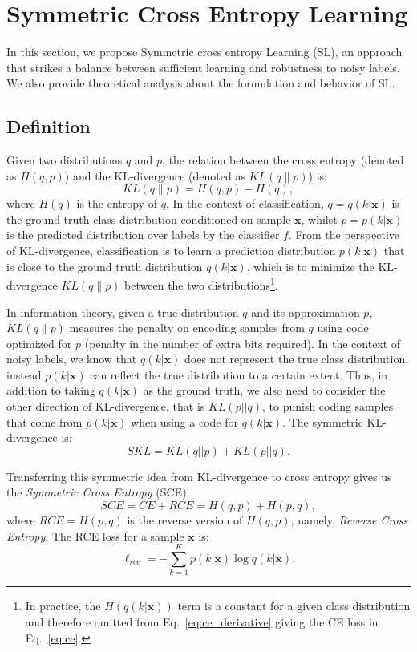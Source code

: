 \documentclass[10pt,twocolumn,letterpaper]{article}
\def \xx {\mathbf{x}}
\begin{document}
\section{Symmetric Cross Entropy Learning}\label{sec:sce}
In this section, we propose Symmetric cross entropy Learning (SL), an approach that strikes a balance between sufficient learning and robustness to noisy labels.  We also provide theoretical analysis about the formulation and behavior of SL.

\subsection{Definition}
Given two distributions $q$ and $p$, the relation between the cross entropy (denoted as $H(q, p)$) and the KL-divergence (denoted as $KL(q\| p)$) is:
\begin{equation}
\label{eq:ce_derivative}
KL(q \| p) = H(q, p) - H(q),
\end{equation}
where $H(q)$ is the entropy of $q$. In the context of classification, $q=q(k|\xx)$ is the ground truth class distribution conditioned on sample $\xx$, whilst $p=p(k|\xx)$ is the predicted distribution over labels by the classifier $f$. From the perspective of KL-divergence, classification is to learn a prediction distribution $p(k|\xx)$ that is close to the ground truth distribution $q(k|\xx)$, which is to minimize the KL-divergence $KL(q\| p)$ between the two distributions\footnote{In practice, the $H(q(k|\xx))$ term is a constant for a given class distribution and therefore omitted from Eq.~\eqref{eq:ce_derivative} giving the CE loss in Eq.~\eqref{eq:ce}.}.

In information theory, given a true distribution $q$ and its approximation $p$, $KL(q\|p)$ measures the penalty on encoding samples from $q$ using code optimized for $p$ (penalty in the number of extra bits required). In the context of noisy labels, we know that $q(k|\xx)$ does not represent the true class distribution, instead $p(k|\xx)$ can reflect the true distribution to a certain extent. Thus, in addition to taking $q(k|\xx)$ as the ground truth, we also need to consider the other direction of KL-divergence, that is $KL(p||q)$, to punish coding samples that come from $p(k|\xx)$ when using a code for $q(k|\xx)$. The symmetric KL-divergence is:
\begin{equation}\label{kl_sym}
SKL = KL(q||p) + KL(p||q).
\end{equation}

Transferring this symmetric idea from KL-divergence to cross entropy gives us the \textit{Symmetric Cross Entropy} (SCE):
\begin{equation}\label{ce_sym}
SCE = CE + RCE = H(q, p) + H(p, q),
\end{equation}
where $RCE=H(p, q)$ is the reverse version of $H(q, p)$, namely, \emph{Reverse Cross Entropy}. The RCE loss for a sample $\xx$ is:
\begin{equation}\label{eq:rce}
    \ell_{rce} = -\sum_{k=1}^{K} p(k|\xx) \log q(k|\xx).
\end{equation}
\end{document}
